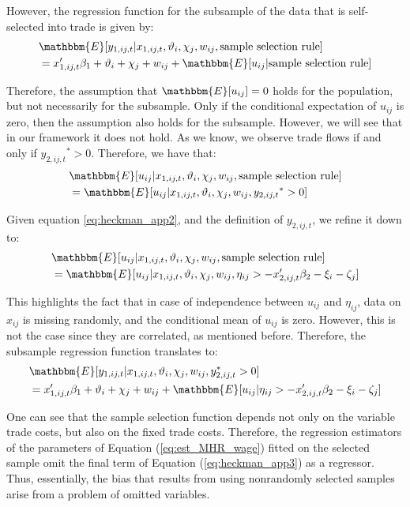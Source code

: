However, the regression function for the subsample of the data that is self-selected into trade is given by:
\begin{align}
&\mathbbm{E} [y_{1,ij,t} \rvert x_{1,ij,t}, \vartheta_i, \chi_j,  w_{i j}, \text{sample selection rule}]   \\
&= x_{1,ij,t}'\beta_1 + \vartheta_i + \chi_j +  w_{i j} + \mathbbm{E} [u_{ij} \rvert \text{sample selection rule}] \nonumber
\label{eq:heckman_app2}
\end{align}

Therefore, the assumption that $\mathbbm{E}[u_{ij}] = 0$ holds for the population, but not necessarily for the subsample. Only if the conditional expectation of $u_{ij}$ is zero, then the assumption also holds for the subsample. However, we will see that in our framework it does not hold. As we know, we observe trade flows if and only if ${y_{2,ij,t}}^* > 0$. Therefore, we have that:
\begin{align}
&\mathbbm{E} [u_{ij} \rvert x_{1,ij,t}, \vartheta_i, \chi_j, w_{ij},\text{sample selection rule}] \\
 &= \mathbbm{E} [u_{ij} \rvert x_{1,ij,t}, \vartheta_i, \chi_j,  w_{ij}, {y_{2,ij,t}}^* > 0] \nonumber
\end{align}

Given equation \ref{eq:heckman_app2}, and the definition of $y_{2,ij,t}$, we refine it down to:
\begin{align}
&\mathbbm{E} [u_{ij} \rvert x_{1,ij,t}, \vartheta_i, \chi_j, w_{ij},\text{sample selection rule}]  \\
&= \mathbbm{E} [u_{ij} \rvert x_{1,ij,t}, \vartheta_i, \chi_j,  w_{ij}, \eta_{ij} > -  x_{2,ij,t}'{\beta_2} -\xi_{i}-\zeta_{j}] \nonumber
\end{align}

This highlights the fact that in case of independence between $u_{ij}$ and $\eta_{ij}$, data on $x_{ij}$ is missing randomly, and the conditional mean of $u_{ij}$ is zero. However, this is not the case since they are correlated, as mentioned before. Therefore, the subsample regression function translates to:
\begin{align}
    &\mathbbm{E} [y_{1,ij,t} \rvert x_{1,ij,t}, \vartheta_i, \chi_j,  w_{i j}, y_{2,ij,t}^* > 0] \\
    &= x_{1,ij,t}'\beta_1 + \vartheta_i + \chi_j +  w_{i j} + \mathbbm{E} [u_{ij} \rvert  \eta_{i j} > - x_{2,ij,t}'\beta_2 -\xi_{i}-\zeta_{j}]  \nonumber
\label{eq:heckman_app3}
\end{align}

One can see that the sample selection function depends not only on the variable trade costs, but also on the fixed trade costs. Therefore, the regression estimators of the parameters of Equation (\ref{eq:est_MHR_wage}) fitted on the selected sample omit the final term of Equation (\ref{eq:heckman_app3}) as a regressor. Thus, essentially, the bias that results from using nonrandomly selected samples arise from a problem of omitted variables. 

